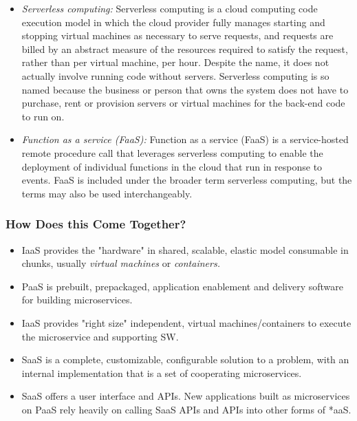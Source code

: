 \documentclass[11pt]{article}
\providecommand{\tightlist}{%
      \setlength{\itemsep}{0pt}\setlength{\parskip}{0pt}}
\begin{document}
\begin{itemize}
\item
  \emph{Serverless computing:} Serverless computing is a cloud computing
  code execution model in which the cloud provider fully manages
  starting and stopping virtual machines as necessary to serve requests,
  and requests are billed by an abstract measure of the resources
  required to satisfy the request, rather than per virtual machine, per
  hour. Despite the name, it does not actually involve running code
  without servers. Serverless computing is so named because the business
  or person that owns the system does not have to purchase, rent or
  provision servers or virtual machines for the back-end code to run on.
\item
  \emph{Function as a service (FaaS):} Function as a service (FaaS) is a
  service-hosted remote procedure call that leverages serverless
  computing to enable the deployment of individual functions in the
  cloud that run in response to events. FaaS is included under the
  broader term serverless computing, but the terms may also be used
  interchangeably.
\end{itemize}

     

    \subsubsection{How Does this Come
Together?}\label{how-does-this-come-together}

\begin{itemize}
\tightlist
\item
  IaaS provides the "hardware" in shared, scalable, elastic model
  consumable in chunks, usually \emph{virtual machines} or
  \emph{containers.}
\item
  PaaS is prebuilt, prepackaged, application enablement and delivery
  software for building microservices.
\item
  IaaS provides "right size" independent, virtual machines/containers to
  execute the microservice and supporting SW.
\item
  SaaS is a complete, customizable, configurable solution to a problem,
  with an internal implementation that is a set of cooperating
  microservices.
\item
  SaaS offers a user interface and APIs. New applications built as
  microservices on PaaS rely heavily on calling SaaS APIs and APIs into
  other forms of *aaS.
\end{itemize}
\end{document}
